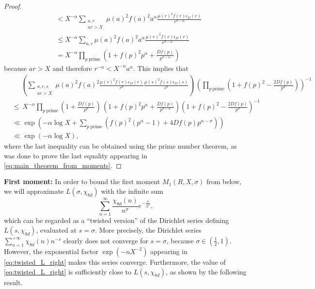 \documentclass[10pt,a4paper]{amsart}
\theoremstyle{plain}
\theoremstyle{definition}
\theoremstyle{remark}
\begin{document}
\begin{proof}
\begin{align*}
    &< X^{-\alpha} \sum_{\substack{a,r\\ ar>X}} \mu(a)^2f(a)^2 a^{\alpha} \frac{\mu(r)^2f(r)\epsilon_D(r)}{r^{\sigma - \alpha}} \\
    &\leq X^{-\alpha} \sum_{a,r} \mu(a)^2f(a)^2 a^{\alpha} \frac{\mu(r)^2f(r)\epsilon_D(r)}{r^{\sigma - \alpha}} \\
    &= X^{-\alpha} \prod_{p \ \text{prime}} \left( 1 + f(p)^2 p^\alpha + \frac{D f(p)}{p^{\sigma - \alpha}} \right)
\end{align*}
because $ar > X$ and therefore $r^{-\alpha} < X^{-\alpha} a^\alpha$. 
This implies that
\begin{align*}
    &\phantom{\leq} \left( \sum_{\substack{a,r,s\\ ar>X}}
\mu(a)^2f(a)^2\frac{\mu(r)^2f(r)\epsilon_D(r)}{r^\sigma}\frac{\mu(s)^2f(s)\epsilon_D(s)}{s^\sigma} \right) \, \left( \prod_{p \ \text{prime}}\left(1+f(p)^2-\frac{2Df(p)}{p^ \sigma}\right)\right)^{-1} \\ 
     &\leq \ X^{-\alpha} \prod_{p \ \text{prime}} \left( 1+\frac{D f(p)}{p^\sigma} \right) \, \left( 1 + f(p)^2 p^\alpha + \frac{D f(p)}{p^{\sigma - \alpha}} \right) \left(1+f(p)^2-\frac{2Df(p)}{p^ \sigma}\right)^{-1} \\
     &\ll \exp\left(-\alpha\log X+\sum_{p \ \text{prime}}\left(f(p)^2(p^\alpha-1)+4Df(p)p^{\alpha-\sigma}\right)\right)\\
&\ll \exp\left(-\alpha \log X \right),
\end{align*}
where the last inequality can be obtained using the prime number theorem, as was done to prove the last equality appearing in \eqref{eq:main_theorem_from_moments}.
\end{proof}

\textbf{First moment:}
In order to bound the first moment $M_1(R,X,\sigma)$ from below, we will approximate $L(\sigma,\chi_{8d})$ with the infinite sum \begin{equation} \label{eq:twisted_L_right}
    \sum_{n=1}^{\infty} \frac{\chi_{8d}(n)}{n^\sigma} e^{-\frac{n}{X^2}},
\end{equation}
which can be regarded as a ``twisted version'' of the Dirichlet series defining $L(s,\chi_{8d})$, evaluated at $s = \sigma$. More precisely, the Dirichlet series $\sum_{n=1}^{+\infty} \chi_{8d}(n) n^{-s}$ clearly does not converge for $s = \sigma$, because $\sigma \in \left( \frac{1}{2},1 \right)$. However, the exponential factor $\exp(-nX^{-2})$ appearing in \eqref{eq:twisted_L_right} makes this series converge. Furthermore, the value of \eqref{eq:twisted_L_right} is sufficiently close to $L(s,\chi_{8d})$, as shown by the following result.
\end{document}
